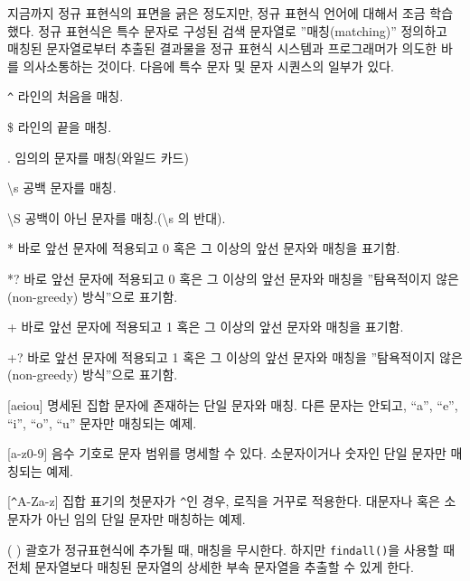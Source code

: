 지금까지 정규 표현식의 표면을 긁은 정도지만, 정규 표현식 언어에 대해서 조금 학습했다.
정규 표현식은 특수 문자로 구성된 검색 문자열로 ''매칭(matching)'' 정의하고 매칭된 문자열로부터 추출된 결과물을 정규 표현식 시스템과 프로그래머가 의도한 바를 의사소통하는 것이다.
다음에 특수 문자 및 문자 시퀀스의 일부가 있다.

\verb"^" \newline
라인의 처음을 매칭.

\$ \newline
라인의 끝을 매칭.

. \newline
임의의 문자를 매칭(와일드 카드)

{\textbackslash}s \newline
공백 문자를 매칭.

{\textbackslash}S \newline
공백이 아닌 문자를 매칭.({\textbackslash}s 의 반대).

* \newline
바로 앞선 문자에 적용되고 0 혹은 그 이상의 앞선 문자와 매칭을 표기함.

*? \newline
바로 앞선 문자에 적용되고 0 혹은 그 이상의 앞선 문자와 매칭을 ''탐욕적이지 않은(non-greedy) 방식''으로 표기함.

+ \newline
바로 앞선 문자에 적용되고 1 혹은 그 이상의 앞선 문자와 매칭을 표기함.

+? \newline
바로 앞선 문자에 적용되고 1 혹은 그 이상의 앞선 문자와 매칭을 ''탐욕적이지 않은(non-greedy) 방식''으로 표기함.

[aeiou] \newline
명세된 집합 문자에 존재하는 단일 문자와 매칭. 다른 문자는 안되고, ``a'', ``e'', ``i'', ``o'', ``u'' 문자만 매칭되는 예제.

[a-z0-9] \newline
음수 기호로 문자 범위를 명세할 수 있다. 소문자이거나 숫자인 단일 문자만 매칭되는 예제.

[\verb"^"A-Za-z] \newline
집합 표기의 첫문자가 {\verb"^"}인 경우, 로직을 거꾸로 적용한다. 
대문자나 혹은 소문자가 아닌 임의 단일 문자만 매칭하는 예제.

( ) \newline
괄호가 정규표현식에 추가될 때, 매칭을 무시한다. 
하지만 {\tt findall()}을 사용할 때 전체 문자열보다 매칭된 문자열의 상세한 부속 문자열을 추출할 수 있게 한다.

